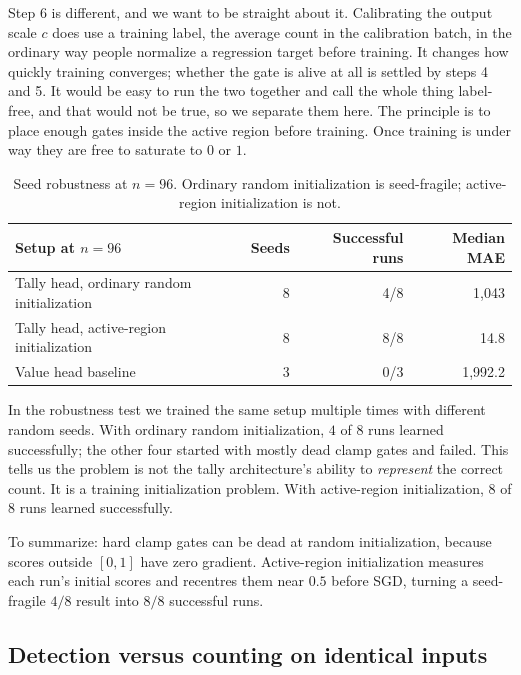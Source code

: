 \documentclass[10pt]{article}
\theoremstyle{definition}
\begin{document}
Step 6 is different, and we want to be straight about it. Calibrating the
output scale $c$ does use a training label, the average count in the
calibration batch, in the ordinary way people normalize a regression target
before training. It changes how quickly training converges; whether the
gate is alive at all is settled by steps 4 and 5. It would be easy to run
the two together and call the whole thing label-free, and that would not be
true, so we separate them here. The principle is to place enough gates
inside the active region before training. Once training is under way they
are free to saturate to $0$ or $1$.

\begin{table}[htbp]
\centering
\caption{Seed robustness at $n = 96$. Ordinary random initialization is
seed-fragile; active-region initialization is not.}
\label{tab:seeds}
\begin{tabular}{@{}lrrr@{}}
\toprule
\textbf{Setup at $n = 96$} & \textbf{Seeds} & \textbf{Successful runs} & \textbf{Median MAE} \\
\midrule
Tally head, ordinary random initialization & 8 & 4/8 & 1{,}043 \\
Tally head, active-region initialization   & 8 & 8/8 & 14.8 \\
Value head baseline                        & 3 & 0/3 & 1{,}992.2 \\
\bottomrule
\end{tabular}
\end{table}

In the robustness test we trained the same setup multiple times with
different random seeds. With ordinary random initialization, $4$ of $8$
runs learned successfully; the other four started with mostly dead clamp
gates and failed. This tells us the problem is not the tally
architecture's ability to \emph{represent} the correct count. It is a
training initialization problem. With active-region initialization, $8$ of
$8$ runs learned successfully.

To summarize: hard clamp gates can be dead at random initialization,
because scores outside $[0,1]$ have zero gradient. Active-region
initialization measures each run's initial scores and recentres them near
$0.5$ before SGD, turning a seed-fragile $4/8$ result into $8/8$
successful runs.

\subsection{Detection versus counting on identical inputs}
\label{sec:twincontrol}
\end{document}
